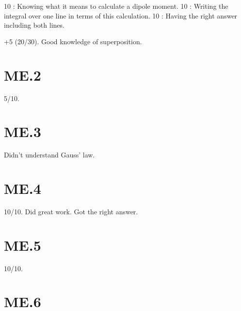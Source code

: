 \documentclass{article}
\begin{document}
10 : Knowing what it means to calculate a dipole moment.
10 : Writing the integral over one line in terms of this calculation.
10 : Having the right answer including both lines.

+5 (20/30). Good knowledge of superposition.

\section*{ME.2}
\label{sec:me_2}

5/10.

\section*{ME.3}
\label{sec:me_3}

Didn't understand Gauss' law.

\section*{ME.4}
\label{sec:me_4}

10/10. Did great work. Got the right answer.

\section*{ME.5}
\label{sec:me_5}

10/10.

\section*{ME.6}
\label{sec:me_6}
\end{document}
